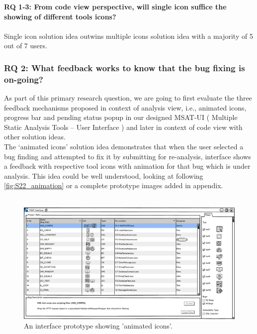 \begin{myboxi}{{\textbf{RQ 1-3: From code view perspective, will single icon suffice the showing of different tools icons?}}}
\\ \\ Single icon solution idea outwins multiple icons solution idea with a majority of 5 out of 7 users. 
\end{myboxi}


\subsubsection{RQ 2: What feedback works to know that the bug fixing is on-going?}

As part of this primary research question, we are going to first evaluate the three feedback mechanisms proposed in context of analysis view, i.e., animated icons, progress bar and pending status popup in our designed MSAT-UI ( Multiple Static Analysis Tools – User Interface ) and later in context of code view with other solution ideas. \\

The ‘animated icons’ solution idea demonstrates that when the user selected a bug finding and attempted to fix it by submitting for re-analysis, interface shows a feedback with respective tool icons with animation for that bug which is under analysis. This idea could be well understood, looking at following \autoref{fig:S22_animation} or a complete prototype images added in appendix.  \\ \\


\begin{figure}[hbt!]
	\centering
	\includegraphics[width=\linewidth]{figures/solution_ideas_snaps/S22_animation}
	\caption{An interface prototype showing 'animated icons'.}
	\label{fig:S22_animation}
\end{figure}


